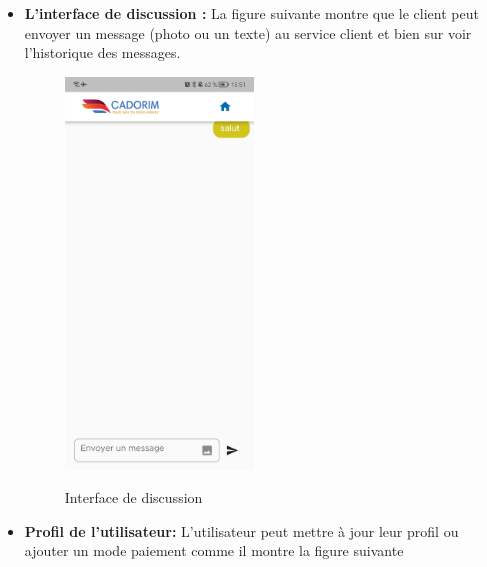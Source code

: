 \begin{itemize}[label=$\ast$]
\item \textbf{L’interface de discussion
	:} La figure suivante montre que le client peut envoyer un message (photo ou un texte) au service client et bien sur voir l'historique des messages.
	\begin{figure}%
	\centering
	{{\includegraphics[width=5cm]{./Template LaTeX/Images/21.jpg} }}%
	\caption{Interface de discussion}%
	\label{fig:example}%
\end{figure}
\newpage
\item \textbf{Profil de l'utilisateur:} L'utilisateur peut mettre à jour leur profil ou ajouter un mode paiement comme il montre la figure suivante
\begin{figure}
	\centering
	\begin{subfigure}[b]{0.3\textwidth}
		\centering

\end{subfigure}
\end{figure}
\end{itemize}
